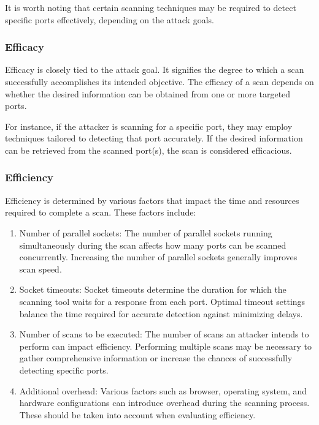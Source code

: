 It is worth noting that certain scanning techniques may be required to detect specific ports effectively, depending on the attack goals.

\subsubsection{Efficacy}

Efficacy is closely tied to the attack goal. 
It signifies the degree to which a scan successfully accomplishes its intended objective. 
The efficacy of a scan depends on whether the desired information can be obtained from one or more targeted ports.

For instance, if the attacker is scanning for a specific port, they may employ techniques tailored to detecting that port accurately. If the desired information can be retrieved from the scanned port(s), the scan is considered efficacious.

\subsubsection{Efficiency}

Efficiency is determined by various factors that impact the time and resources required to complete a scan. These factors include:

\begin{enumerate}[label=\alph*.]
    \item Number of parallel sockets: The number of parallel sockets running simultaneously during the scan affects how many ports can be scanned concurrently. Increasing the number of parallel sockets generally improves scan speed.
    
    \item Socket timeouts: Socket timeouts determine the duration for which the scanning tool waits for a response from each port. Optimal timeout settings balance the time required for accurate detection against minimizing delays.
    
    \item Number of scans to be executed: The number of scans an attacker intends to perform can impact efficiency. Performing multiple scans may be necessary to gather comprehensive information or increase the chances of successfully detecting specific ports.
    
    \item Additional overhead: Various factors such as browser, operating system, and hardware configurations can introduce overhead during the scanning process. These should be taken into account when evaluating efficiency.
\end{enumerate}

